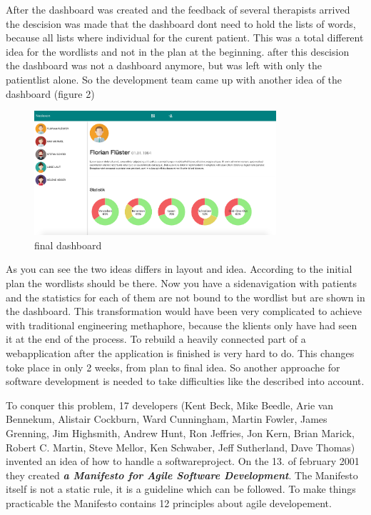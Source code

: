 After the dashboard was created and the feedback of several therapists arrived the descision was made that the dashboard dont need to hold the lists
of words, because all lists where individual for the curent patient. This was a total different idea for the wordlists and not in the plan at the beginning.
after this descision the dashboard was not a dashboard anymore, but was left with only the patientlist alone. So the development team came up with another
idea of the dashboard (figure 2)

\begin{figure}[h!]
  \centering
  \includegraphics[width=0.8\textwidth]{images/sidenav.png}
  \caption{final dashboard}
\end{figure}

\newpage

As you can see the two ideas differs in layout and idea. According to the initial plan the wordlists should be there. Now you have a sidenavigation
with patients and the statistics for each of them are not bound to the wordlist but are shown in the dashboard. This transformation would have been very
complicated to achieve with traditional engineering methaphore, because the klients only have had seen it at the end of the process. To rebuild a heavily
connected part of a webapplication after the application is finished is very hard to do. This changes toke place in only 2 weeks, from plan to final idea.
So another approache for software development is needed to take difficulties like the described into account.

To conquer this problem, 17 developers (Kent Beck, Mike Beedle, Arie van Bennekum, Alistair Cockburn, Ward Cunningham, Martin Fowler, James Grenning,
Jim Highsmith, Andrew Hunt, Ron Jeffries, Jon Kern, Brian Marick, Robert C. Martin, Steve Mellor, Ken Schwaber, Jeff Sutherland, Dave Thomas)
invented an idea of how to handle a softwareproject. On the 13. of february 2001 they created \textbf{\textit{a Manifesto for Agile Software Development}}.
The Manifesto itself is not a static rule, it is a guideline which can be followed. To make things practicable the Manifesto contains 12 principles about
agile developement.


